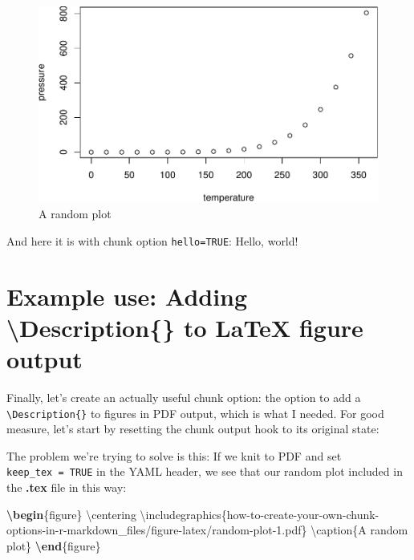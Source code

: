 \documentclass[sigchi, ]{acmart}
\newenvironment{Shaded}{\begin{snugshade}}{\end{snugshade}}
\newcommand{\BuiltInTok}[1]{#1}
\newcommand{\DataTypeTok}[1]{\textcolor[rgb]{0.13,0.29,0.53}{#1}}
\newcommand{\ExtensionTok}[1]{#1}
\newcommand{\FunctionTok}[1]{\textcolor[rgb]{0.00,0.00,0.00}{#1}}
\newcommand{\KeywordTok}[1]{\textcolor[rgb]{0.13,0.29,0.53}{\textbf{#1}}}
\newcommand{\NormalTok}[1]{#1}
\newcommand{\OperatorTok}[1]{\textcolor[rgb]{0.81,0.36,0.00}{\textbf{#1}}}
\begin{document}
\begin{figure}
\centering
\includegraphics{how-to-create-your-own-chunk-options-in-r-markdown_files/figure-latex/random-plot-no-hello-1.pdf}
\caption{\label{fig:random-plot-no-hello}A random plot}
\end{figure}

And here it is with chunk option \texttt{hello=TRUE}:
Hello, world!

\hypertarget{example-use-adding-description-to-latex-figure-output}{%
\section{Example use: Adding \textbackslash{}Description\{\} to LaTeX figure output}\label{example-use-adding-description-to-latex-figure-output}}

Finally, let's create an actually useful chunk option: the option to add a \texttt{\textbackslash{}Description\{\}} to figures in PDF output, which is what I needed. For good measure, let's start by resetting the chunk output hook to its original state:

\begin{Shaded}
\end{Shaded}

The problem we're trying to solve is this: If we knit to PDF and set \texttt{keep\_tex\ =\ TRUE} in the YAML header, we see that our random plot included in the \textbf{.tex} file in this way:

\begin{Shaded}
\begin{Highlighting}[]
\KeywordTok{\textbackslash{}begin}\NormalTok{\{}\ExtensionTok{figure}\NormalTok{\}}
\FunctionTok{\textbackslash{}centering}
\BuiltInTok{\textbackslash{}includegraphics}\NormalTok{\{}\ExtensionTok{how-to-create-your-own-chunk-options-in-r-markdown_files/figure-latex/random-plot-1.pdf}\NormalTok{\}}
\FunctionTok{\textbackslash{}caption}\NormalTok{\{A random plot\}}
\KeywordTok{\textbackslash{}end}\NormalTok{\{}\ExtensionTok{figure}\NormalTok{\}}
\end{Highlighting}
\end{Shaded}
\end{document}
